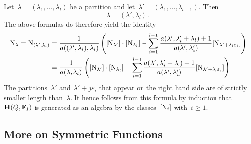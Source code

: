 \documentclass[a4paper, 11pt, twoside=semi]{scrartcl}
\begin{document}
\begin{remark}
  \label{indecomposables generate hall algebra}
  Let~$\lambda = (\lambda_1, \dotsc, \lambda_l)$ be a partition and let~$\lambda' = (\lambda_1, \dotsc, \lambda_{l-1})$.
  Then
  \[
    \lambda = (\lambda', \lambda_l) \,.
  \]
  The above formulas do therefore yield the identity
  \begin{align}
    \mathrm{N}_\lambda
    =
    \mathrm{N}_{(\lambda', \lambda_l)}
    &=
    \frac{1}{a((\lambda', \lambda_l), \lambda_l)}
    \left(
      [ \mathrm{N}_{\lambda'} ]
      \cdot
      [ \mathrm{N}_{\lambda_l} ]
      -
      \sum_{i=1}^{l-1}
      \frac{ a(\lambda', \lambda'_i + \lambda_l) + 1 }{ a(\lambda', \lambda'_i) }
      [ \mathrm{N}_{\lambda' + \lambda_l \varepsilon_i} ]
    \right)
    \notag
    \\
    &=
    \frac{1}{a(\lambda, \lambda_l)}
    \left(
      [ \mathrm{N}_{\lambda'} ]
      \cdot
      [ \mathrm{N}_{\lambda_l} ]
      -
      \sum_{i=1}^{l-1}
      \frac{ a(\lambda', \lambda'_i + \lambda_l) + 1 }{ a(\lambda', \lambda'_i) }
      [ \mathrm{N}_{\lambda' + \lambda_l \varepsilon_i} ]
    \right)
    \label{identity for representations}
  \end{align}
  The partitions~$\lambda'$ and~$\lambda' + j \varepsilon_i$ that appear on the right hand side are of strictly smaller length than~$\lambda$.
  It hence follows from this formula by induction that~$\mathbf{H}(Q, \mathbb{F}_1)$ is generated as an algebra by the classes~$[\mathrm{N}_i]$ with~$i \geq 1$.
\end{remark}



\subsection{More on Symmetric Functions}
\label{wrong symmetric functions}
\end{document}
